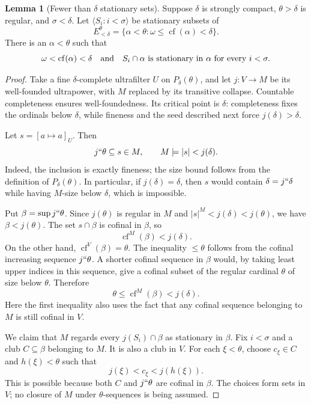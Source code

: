 \documentclass[11pt,letterpaper]{article}
\theoremstyle{definition}
\newtheorem{lemma}[definition]{Lemma}
\numberwithin{equation}{section}
\newcommand{\cf}{\operatorname{cf}}
\begin{document}
\begin{lemma}[Fewer than $\delta$ stationary sets]\label{lem:reflection}
Suppose $\delta$ is strongly compact, $\theta>\delta$ is regular, and $\sigma<\delta$. Let
$\langle S_i:i<\sigma\rangle$ be stationary subsets of
\[
E^\theta_{<\delta}=\{\alpha<\theta:\omega\le\cf(\alpha)<\delta\}.
\]
There is an $\alpha<\theta$ such that
\[
\omega<\cf(\alpha)<\delta
\quad\hbox{and}\quad
S_i\cap\alpha\text{ is stationary in }\alpha\text{ for every }i<\sigma.
\]
\end{lemma}
\begin{proof}
Take a fine $\delta$-complete ultrafilter $U$ on $P_\delta(\theta)$, and let
$j:V\to M$ be its well-founded ultrapower, with $M$ replaced by its transitive collapse. Countable completeness ensures well-foundedness. Its critical point is $\delta$: completeness fixes the ordinals below $\delta$, while fineness and the seed described next force $j(\delta)>\delta$.

Let $s=[a\mapsto a]_U$. Then
\[
j``\theta\subseteq s\in M,
\qquad M\models |s|<j(\delta).
\]
Indeed, the inclusion is exactly fineness; the size bound follows from the definition of $P_\delta(\theta)$. In particular, if $j(\delta)=\delta$, then $s$ would contain $\delta=j``\delta$ while having $M$-size below $\delta$, which is impossible.

Put $\beta=\sup j``\theta$. Since $j(\theta)$ is regular in $M$ and $|s|^M<j(\delta)<j(\theta)$, we have $\beta<j(\theta)$. The set $s\cap\beta$ is cofinal in $\beta$, so
\[
\cf^M(\beta)<j(\delta).
\]
On the other hand, $\cf^V(\beta)=\theta$. The inequality $\le\theta$ follows from the cofinal increasing sequence $j``\theta$. A shorter cofinal sequence in $\beta$ would, by taking least upper indices in this sequence, give a cofinal subset of the regular cardinal $\theta$ of size below $\theta$. Therefore
\begin{equation}\label{eq:betacof}
\theta\le\cf^M(\beta)<j(\delta).
\end{equation}
Here the first inequality also uses the fact that any cofinal sequence belonging to $M$ is still cofinal in $V$.

We claim that $M$ regards every $j(S_i)\cap\beta$ as stationary in $\beta$. Fix $i<\sigma$ and a club $C\subseteq\beta$ belonging to $M$. It is also a club in $V$. For each $\xi<\theta$, choose $c_\xi\in C$ and $h(\xi)<\theta$ such that
\[
j(\xi)<c_\xi<j(h(\xi)).
\]
This is possible because both $C$ and $j``\theta$ are cofinal in $\beta$. The choices form sets in $V$; no closure of $M$ under $\theta$-sequences is being assumed.


\end{proof}
\end{document}
